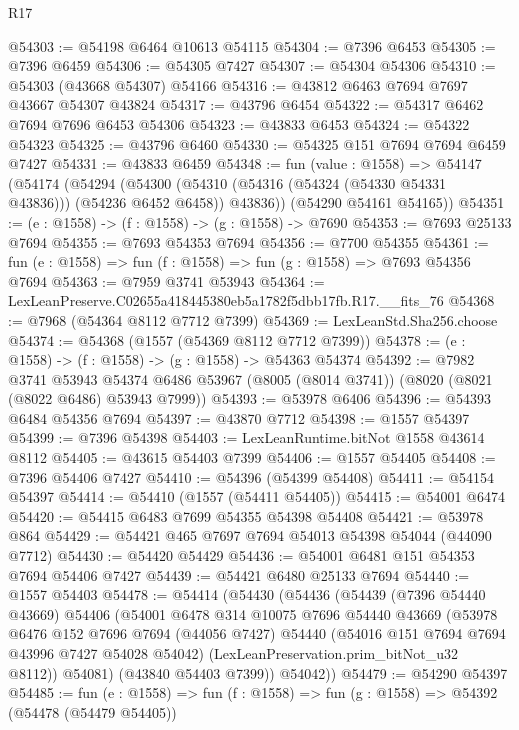 \begin{lexlean}{R17}
\begin{coremodule}
@54303 := @54198 @6464 @10613 @54115
@54304 := @7396 @6453
@54305 := @7396 @6459
@54306 := @54305 @7427
@54307 := @54304 @54306
@54310 := @54303 (@43668 @54307) @54166
@54316 := @43812 @6463 @7694 @7697 @43667 @54307 @43824
@54317 := @43796 @6454
@54322 := @54317 @6462 @7694 @7696 @6453 @54306
@54323 := @43833 @6453
@54324 := @54322 @54323
@54325 := @43796 @6460
@54330 := @54325 @151 @7694 @7694 @6459 @7427
@54331 := @43833 @6459
@54348 := fun (value : @1558) =>
  @54147
    (@54174
      (@54294
        (@54300 (@54310 (@54316 (@54324 (@54330 @54331 @43836))) (@54236 @6452 @6458)) @43836))
      (@54290 @54161 @54165))
@54351 := (e : @1558) -> (f : @1558) -> (g : @1558) -> @7690
@54353 := @7693 @25133 @7694
@54355 := @7693 @54353 @7694
@54356 := @7700 @54355
@54361 := fun (e : @1558) => fun (f : @1558) => fun (g : @1558) => @7693 @54356 @7694
@54363 := @7959 @3741 @53943
@54364 := LexLeanPreserve.C02655a418445380eb5a1782f5dbb17fb.R17.__fits_76
@54368 := @7968 (@54364 @8112 @7712 @7399)
@54369 := LexLeanStd.Sha256.choose
@54374 := @54368 (@1557 (@54369 @8112 @7712 @7399))
@54378 := (e : @1558) -> (f : @1558) -> (g : @1558) -> @54363 @54374
@54392 := @7982
    @3741
    @53943
    @54374
    @6486
    @53967
    (@8005 (@8014 @3741))
    (@8020 (@8021 (@8022 @6486) @53943 @7999))
@54393 := @53978 @6406
@54396 := @54393 @6484 @54356 @7694
@54397 := @43870 @7712
@54398 := @1557 @54397
@54399 := @7396 @54398
@54403 := LexLeanRuntime.bitNot @1558 @43614 @8112
@54405 := @43615 @54403 @7399
@54406 := @1557 @54405
@54408 := @7396 @54406 @7427
@54410 := @54396 (@54399 @54408)
@54411 := @54154 @54397
@54414 := @54410 (@1557 (@54411 @54405))
@54415 := @54001 @6474
@54420 := @54415 @6483 @7699 @54355 @54398 @54408
@54421 := @53978 @864
@54429 := @54421 @465 @7697 @7694 @54013 @54398 @54044 (@44090 @7712)
@54430 := @54420 @54429
@54436 := @54001 @6481 @151 @54353 @7694 @54406 @7427
@54439 := @54421 @6480 @25133 @7694
@54440 := @1557 @54403
@54478 := @54414
    (@54430
      (@54436
        (@54439
          (@7396 @54440 @43669)
          @54406
          (@54001
            @6478
            @314
            @10075
            @7696
            @54440
            @43669
            (@53978
              @6476
              @152
              @7696
              @7694
              (@44056 @7427)
              @54440
              (@54016 @151 @7694 @7694 @43996 @7427 @54028 @54042)
              (LexLeanPreservation.prim_bitNot_u32 @8112))
            @54081)
          (@43840 @54403 @7399))
        @54042))
@54479 := @54290 @54397
@54485 := fun (e : @1558) => fun (f : @1558) => fun (g : @1558) => @54392 (@54478 (@54479 @54405))

\end{coremodule}
\end{lexlean}
